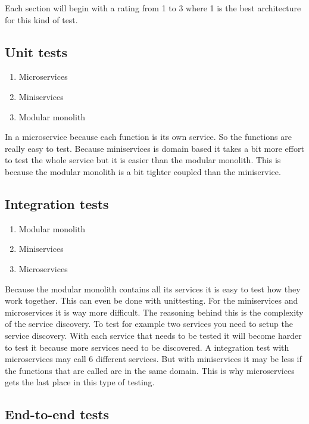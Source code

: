 Each section will begin with a rating from 1 to 3 where 1 is the best architecture for this kind of test.

\subsection{Unit tests}
\label{sec:UnitTests}

\begin{enumerate}
        \item Microservices
        \item Miniservices
        \item Modular monolith
\end{enumerate}

In a microservice because each function is its own service. So the functions are really easy to test. Because miniservices is domain based it takes a bit more effort to test the whole service but it is easier than the modular monolith. This is because the modular monolith is a bit tighter coupled than the miniservice.

\subsection{Integration tests}

\begin{enumerate}
        \item Modular monolith
        \item Miniservices
        \item Microservices
\end{enumerate}

Because the modular monolith contains all its services it is easy to test how they work together. This can even be done with unittesting. For the miniservices and microservices it is way more difficult. The reasoning behind this is the complexity of the service discovery. To test for example two services you need to setup the service discovery. With each service that needs to be tested it will become harder to test it because more services need to be discovered. A integration test with microservices may call 6 different services. But with miniservices it may be less if the functions that are called are in the same domain. This is why microservices gets the last place in this type of testing.

\subsection{End-to-end tests}


